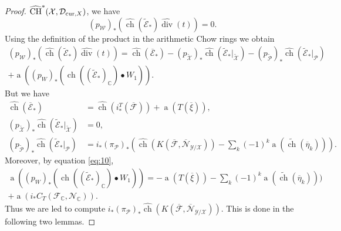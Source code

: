 \documentclass[10pt,twoside]{article}
\numberwithin{equation}{section}
\theoremstyle{plain}
\theoremstyle{definition}
\DeclareMathOperator{\dv}{div}
\DeclareMathOperator{\cha}{\widehat{CH}}
\DeclareMathOperator{\ch}{ch}
\DeclareMathOperator{\amap}{a}
\newcommand{\D}{\text{{\rm cur}}}
\begin{document}
\begin{proof}
  $\cha^{\ast}(\mathcal{X},\mathcal{D}_{\D,X} )$, we have
  \begin{displaymath}
    (p_{\mathcal{W}})_{\ast}(\widehat{\ch}(\widetilde
    {\mathcal{E}}_{\ast})\widehat {\dv}(t))=0.
  \end{displaymath}
  Using the definition of the product in the arithmetic Chow rings
  we obtain
  \begin{multline}\label{eq:96}
    (p_{\mathcal{W}})_{\ast}(\widehat{\ch}(\widetilde
    {\mathcal{E}}_{\ast})\widehat {\dv}(t))=\widehat{\ch}(
    \overline{\mathcal{E}}_{\ast})-
    (p_{\widetilde{\mathcal{X}}})_{\ast}\widehat{\ch}(
    \widetilde {\mathcal{E}}_{\ast}|_{\widetilde{\mathcal{X}}})
    -(p_{\widetilde{\mathcal{P}}})_{\ast}\widehat{\ch}(
    \widetilde{\mathcal{E}}_{\ast}|_{\mathcal{P}})\\+
    \amap((p_{W})_{\ast}(\ch((\widetilde{\mathcal{E}}_{\ast})_{\mathbb{C}})
    \bullet W_{1})).
  \end{multline}
  But we have
  \begin{align}
    \widehat{\ch}(
    \overline{\mathcal{E}}_{\ast})&=\widehat{\ch}(i^{T}_{\ast}(\overline
    {\mathcal{F}}))+\amap(T(\overline {\xi})),\label{eq:97}\\
    (p_{\widetilde{\mathcal{X}}})_{\ast}\widehat{\ch}(
    \widetilde {\mathcal{E}}_{\ast}|_{\widetilde{\mathcal{X}}})
    &=0,\label{eq:98}\\
    (p_{\widetilde{\mathcal{P}}})_{\ast}\widehat{\ch}(
    \widetilde{\mathcal{E}}_{\ast}|_{\mathcal{P}})&=
    i_{\ast}(\pi _{\mathcal{P}})_{\ast}(
    \widehat{\ch}(K(\overline{\mathcal{F}},
    \overline{\mathcal{N}}_{\mathcal{Y}/\mathcal{X}}))
    -\sum_{k}(-1)^{k}\amap(\widetilde{\ch}(\overline{\eta}_{k}))).\label{eq:99} 
  \end{align}
  Moreover, by equation \eqref{eq:10},
  \begin{multline}\label{eq:65}
    \amap((p_{W})_{\ast}(\ch((\widetilde{\mathcal{E}}_{\ast})_{\mathbb{C}})
    \bullet W_{1}))=
    -\amap(T(\overline{\xi})) -
    \sum_{k}(-1)^{k}\amap(\widetilde{\ch}(\overline{\eta}_{k})))\\
    +\amap(i_{\ast}C_{T}(\mathcal{F}_{\mathbb{C}},\mathcal{N}_{\mathbb{C}})). 
  \end{multline}
  Thus we are led to compute $ i_{\ast}(\pi _{\mathcal{P}})_{\ast}
    \widehat{\ch}(K(\overline{\mathcal{F}},
    \overline{\mathcal{N}}_{\mathcal{Y}/\mathcal{X}}))$. This is done
    in the following two lemmas.


\end{proof}
\end{document}
